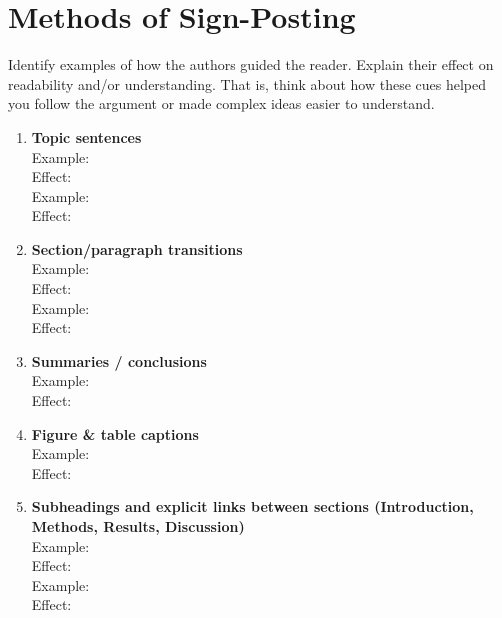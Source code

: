 \documentclass[10pt]{article}
\begin{document}
	\pagebreak

	\section*{Methods of Sign-Posting}
	Identify examples of how the authors guided the reader.
	Explain their effect on readability and/or understanding.
	That is, think about how these cues helped you follow the argument or made complex ideas easier to understand.

\begin{enumerate}
    \item \textbf{Topic sentences} \\
        Example: \vspace{0.5em} \\
        Effect: \vspace{1em} \\
		Example: \vspace{0.5em} \\
        Effect: \vspace{1em}
        
    \item \textbf{Section/paragraph transitions} \\
        Example: \vspace{0.5em} \\
        Effect: \vspace{1em} \\
		Example: \vspace{0.5em} \\
        Effect: \vspace{1em}
        
    \item \textbf{Summaries / conclusions} \\
        Example: \vspace{0.5em} \\
        Effect: \vspace{1em} \\
        
    \item \textbf{Figure \& table captions} \\
        Example: \vspace{0.5em} \\
        Effect: \vspace{1em} \\
        
    \item \textbf{Subheadings and explicit links between sections (Introduction, Methods, Results, Discussion)} \\
        Example: \vspace{0.5em} \\
        Effect: \vspace{1em} \\
		Example: \vspace{0.5em} \\
        Effect: \vspace{1em}
\end{enumerate}
	
\end{document}

